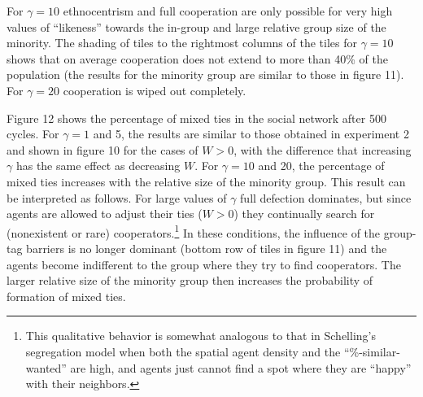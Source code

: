 For $ \gamma = 10 $ ethnocentrism and full cooperation are only possible for very high values of ``likeness'' towards the in-group and large relative group size of the minority. The shading of tiles to the rightmost columns of the tiles for $ \gamma = 10 $ shows that on average cooperation does not extend to more than 40\% of the population (the results for the minority group are similar to those in figure 11). For $ \gamma = 20 $ cooperation is wiped out completely.

Figure 12 shows the percentage of mixed ties in the social network after 500 cycles. For $ \gamma = 1 $ and 5, the results are similar to those obtained in experiment 2 and shown in figure 10 for the cases of $ W > 0 $, with the difference that increasing $ \gamma $ has the same effect as decreasing $ W $. For $ \gamma = 10 $ and 20, the percentage of mixed ties increases with the relative size of the minority group. This result can be interpreted as follows. For large values of $ \gamma $ full defection dominates, but since agents are allowed to adjust their ties ($ W > 0 $) they continually search for (nonexistent or rare) cooperators.\footnote{This qualitative behavior is somewhat analogous to that in Schelling's segregation model when both the spatial agent density and the ``\%-similar-wanted'' are high, and agents just cannot find a spot where they are ``happy'' with their neighbors.} In these conditions, the influence of the group-tag barriers is no longer dominant (bottom row of tiles in figure 11) and the agents become indifferent to the group where they try to find cooperators. The larger relative size of the minority group then increases the probability of formation of mixed ties.
